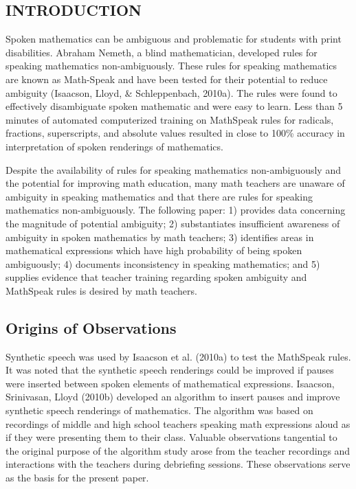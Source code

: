 \documentclass[11.5pt]{sig-alternate} %
\begin{document}
\pagebreak
\clearpage
\begin{large}
\section*{INTRODUCTION}
Spoken mathematics can be ambiguous and problematic for students with print disabilities. Abraham Nemeth, a blind mathematician, developed rules for speaking mathematics non-ambig\-uously. These rules for speaking mathematics are known as Math-Speak and have been tested for their potential to reduce ambiguity (Isaacson, Lloyd, \& Schleppenbach, 2010a). The rules were found to effectively disambiguate spoken mathematic and were easy to learn. Less than 5 minutes of automated computerized training on MathSpeak rules for radicals, fractions, superscripts, and absolute values resulted in close to 100\% accuracy in interpretation of spoken renderings of mathematics.

Despite the availability of rules for speaking mathematics non-ambiguously and the potential for improving math education, many math teachers are unaware of ambiguity in speaking mathematics and that there are rules for speaking mathematics non-ambiguously. The following paper: 1) provides data concerning the magnitude of potential ambiguity; 2) substantiates insufficient awareness of ambiguity in spoken mathematics by math teachers; 3) identifies areas in mathematical expressions which have high probability of being spoken ambiguously; 4) documents inconsistency in speaking mathematics; and 5) supplies evidence that teacher training regarding spoken ambiguity and MathSpeak rules is desired by math teachers.

\subsection*{Origins of Observations}
Synthetic speech was used by Isaacson et al. (2010a) to test the MathSpeak rules. It was noted that the synthetic speech renderings could be improved if pauses were inserted between spoken elements of mathematical expressions. Isaacson, Srinivasan, Lloyd (2010b) developed an algorithm to insert pauses and improve synthetic speech renderings of mathematics. The algorithm was based on recordings of middle and high school teachers speaking math expressions aloud as if they were presenting them to their class. Valuable observations tangential to the original purpose of the algorithm study arose from the teacher recordings and interactions with the teachers during debriefing sessions. These observations serve as the basis for the present paper.


\end{large}
\end{document}
